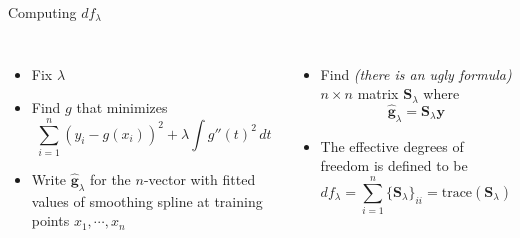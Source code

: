 \documentclass[aspectratio=169,usenames,dvipsnames]{beamer}
\newcommand{\InstructorNotes}[1]{\textit{\color{orange}#1}}
\begin{document}
\begin{frame}[t]{Computing $df_\lambda$}

\begin{columns}
\centering
\begin{itemize}
	\item Fix $\lambda$
	\item Find $g$ that minimizes
	\begin{equation*}
		\sum_{i=1}^n (y_i-g(x_i))^2 + \lambda \int g''(t)^2 \,dt
	\end{equation*}
	\item Write $\hat {\boldsymbol g}_\lambda$ for the $n$-vector with fitted values of smoothing spline at training points $x_1,\cdots,x_n$
\end{itemize}
\centering
\begin{itemize}
	\item Find \InstructorNotes{(there is an ugly formula)} $n \times n$ matrix ${\boldsymbol S}_\lambda$ where
	\begin{equation*}
		\hat {\boldsymbol g}_\lambda =  {\boldsymbol S}_\lambda \boldsymbol{y}
	\end{equation*}
	\item The effective degrees of freedom is defined to be
	\begin{equation*}
		df_\lambda = \sum_{i=1}^n \{ {\boldsymbol S}_\lambda\} _{ii} = \mathrm{trace}({\boldsymbol S}_\lambda)
	\end{equation*}
\end{itemize}
\end{columns}

\end{frame}
\end{document}
